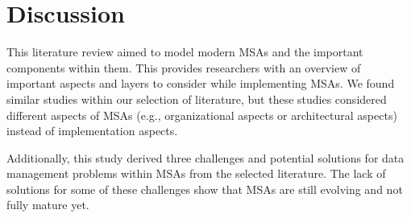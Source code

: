 \section{Discussion}\label{sec:discussion}
This literature review aimed to model modern MSAs and the important components within them. This provides researchers with an overview of important aspects and layers to consider while implementing MSAs. We found similar studies within our selection of literature, but these studies considered different aspects of MSAs (e.g., organizational aspects or architectural aspects) instead of implementation aspects.

Additionally, this study derived three challenges and potential solutions for data management problems within MSAs from the selected literature. The lack of solutions for some of these challenges show that MSAs are still evolving and not fully mature yet.